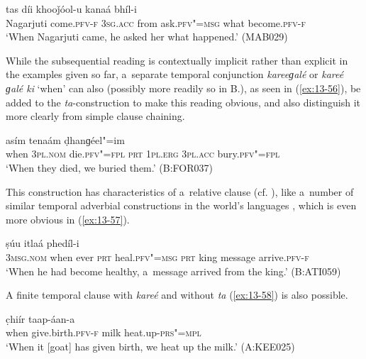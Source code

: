 \begin{exe}
\ex
\label{ex:13-55}
 tas díi khooǰóol-u kanaá bhíl-i \\
Nagarjuti come.\textsc{pfv-f} \textsc{3sg.acc} from ask.\textsc{pfv"=msg}  what become.\textsc{pfv-f} \\
\glt `When Nagarjuti came, he asked her what happened.' (MAB029) 
\end{exe}

While the subsequential reading is contextually implicit rather than explicit in the examples given so far, a~separate temporal conjunction \textit{kareeɡalé} or \textit{kareé ɡalé ki} `when' can also (possibly more readily so in B.), as seen in (\ref{ex:13-56}), be added to the \textit{ta}-construction to make this reading obvious, and also distinguish it more clearly from simple clause chaining.

\begin{exe}
\ex
\label{ex:13-56}
 asím tenaám ḍhanɡéel"=im \\
when \textsc{3pl.nom} die.\textsc{pfv"=fpl} \textsc{prt} \textsc{1pl.erg} \textsc{3pl.acc} bury.\textsc{pfv"=fpl} \\
\glt `When they died, we buried them.' (B:FOR037) 
\end{exe}

This construction has characteristics of a~relative clause (cf. ), like a~number of similar temporal adverbial constructions in the world's languages \citep[180--181]{thompsonlongacre1985}, which is even more obvious in (\ref{ex:13-57}).

\begin{exe}
\ex
\label{ex:13-57}
 ṣúu itlaá phedíl-i \\
\textsc{3msg.nom} when ever \textsc{prt} heal.\textsc{pfv"=msg} \textsc{prt} king message arrive.\textsc{pfv-f} \\
\glt `When he had become healthy, a~message arrived from the king.' (B:ATI059) 
\end{exe}

A finite temporal clause with \textit{kareé} and without \textit{ta} (\ref{ex:13-58}) is also possible.

\begin{exe}
\ex
\label{ex:13-58}
 c̣hiír taap-áan-a \\
when give.birth.\textsc{pfv-f} milk heat.up-\textsc{prs"=mpl} \\
\glt `When it [goat] has given birth, we heat up the milk.' (A:KEE025) 
\end{exe}

